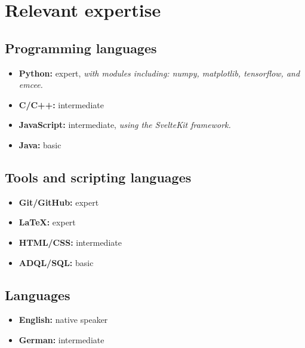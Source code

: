 \documentclass[12pt, letterpaper]{hunt-cv}
\begin{document}


\section*{Relevant expertise}

\subsection*{Programming languages}

\begin{itemize}
    \item \textbf{Python:} expert, \emph{with modules including: numpy, matplotlib, tensorflow, and emcee.}
    \item \textbf{C/C++:} intermediate
    \item \textbf{JavaScript:} intermediate, \emph{using the SvelteKit framework.}
    \item \textbf{Java:} basic
\end{itemize}

\subsection*{Tools and scripting languages}

\begin{itemize}
    \item \textbf{Git/GitHub:} expert
    \item \textbf{LaTeX:} expert
    \item \textbf{HTML/CSS:} intermediate
    \item \textbf{ADQL/SQL:} basic
\end{itemize}

\subsection*{Languages}

\begin{itemize}
    \item \textbf{English:} native speaker
    \item \textbf{German:} intermediate
\end{itemize}
\end{document}
